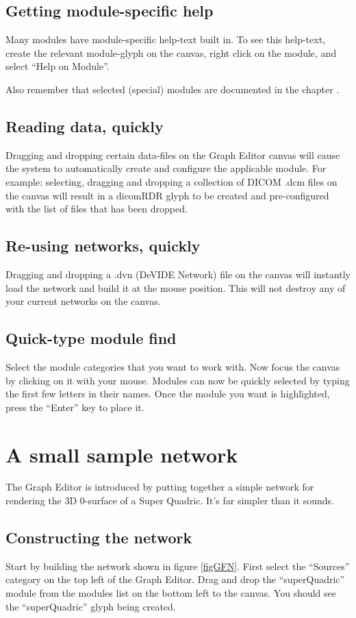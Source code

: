 \subsection{Getting module-specific help}
Many modules have module-specific help-text built in.  To see this
help-text, create the relevant module-glyph on the canvas, right click
on the module, and select ``Help on Module''.

Also remember that selected (special) modules are documented in the
chapter .

\subsection{Reading data, quickly}
Dragging and dropping certain data-files on the Graph Editor canvas
will cause the system to automatically create and configure the
applicable module.  For example: selecting, dragging and dropping a
collection of DICOM .dcm files on the canvas will result in a dicomRDR
glyph to be created and pre-configured with the list of files that has
been dropped.

\subsection{Re-using networks, quickly}
Dragging and dropping a .dvn (DeVIDE Network) file on the canvas will
instantly load the network and build it at the mouse position.  This
will not destroy any of your current networks on the canvas.

\subsection{Quick-type module find}
Select the module categories that you want to work with.  Now focus
the canvas by clicking on it with your mouse.  Modules can now be
quickly selected by typing the first few letters in their names.  Once
the module you want is highlighted, press the ``Enter'' key to place
it.

\section{A small sample network}
The Graph Editor is introduced by putting together a simple network for
rendering the 3D 0-surface of a Super Quadric.  It's far simpler than
it sounds.

\subsection{Constructing the network}
Start by building the network shown in figure \ref{figGFN}.  First
select the ``Sources'' category on the top left of the Graph Editor.
Drag and drop the ``superQuadric'' module from the modules list on the
bottom left to the canvas.  You should see the ``superQuadric'' glyph
being created.

